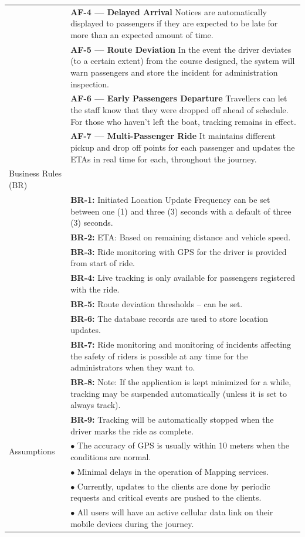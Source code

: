 \begin{longtable}{|>{\raggedright\arraybackslash}p{4cm}|>{\raggedright\arraybackslash}p{11cm}|}
& \textbf{AF-4 — Delayed Arrival} \newline Notices are automatically displayed to passengers if they are expected to be late for more than an expected amount of time. \\
& \textbf{AF-5 — Route Deviation } \newline In the event the driver deviates (to a certain extent) from the course designed, the system will warn passengers and store the incident for administration inspection. \\
& \textbf{AF-6 — Early Passengers Departure} \newline Travellers can let the staff know that they were dropped off ahead of schedule. For those who haven't left the boat, tracking remains in effect. \\
& \textbf{AF-7 — Multi-Passenger Ride} \newline It maintains different pickup and drop off points for each passenger and updates the ETAs in real time for each, throughout the journey. \\
\hline
Business Rules (BR) & \\
& \textbf{BR-1:} Initiated Location Update Frequency can be set between one (1) and three (3) seconds with a default of three (3) seconds.\\
& \textbf{BR-2:} ETA: Based on remaining distance and vehicle speed.\\
& \textbf{BR-3:} Ride monitoring with GPS for the driver is provided from start of ride.\\
& \textbf{BR-4:} Live tracking is only available for passengers registered with the ride.\\
& \textbf{BR-5:} Route deviation thresholds – can be set.\\
& \textbf{BR-6:} The database records are used to store location updates.\\
& \textbf{BR-7:} Ride monitoring and monitoring of incidents affecting the safety of riders is possible at any time for the administrators when they want to.\\
& \textbf{BR-8:} Note: If the application is kept minimized for a while, tracking may be suspended automatically (unless it is set to always track).\\
& \textbf{BR-9:} Tracking will be automatically stopped when the driver marks the ride as complete.\\
\hline
Assumptions & $\bullet$ The accuracy of GPS is usually within 10 meters when the conditions are normal. \\
& $\bullet$ Minimal delays in the operation of Mapping services. \\
& $\bullet$ Currently, updates to the clients are done by periodic requests and critical events are pushed to the clients. \\
& $\bullet$ All users will have an active cellular data link on their mobile devices during the journey. \\
\hline
\end{longtable}

